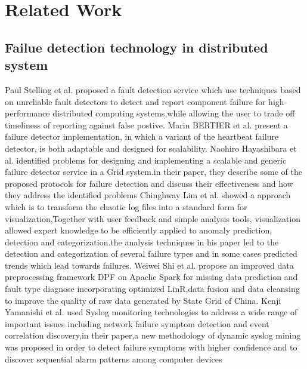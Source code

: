 

\section{Related Work}
\label{related work}


\subsection{Failue detection technology in distributed system}
Paul Stelling et al.\cite{zou2014improving} proposed a fault detection service which use techniques based on unreliable fault detectors to detect and report component failure for high-performance distributed computing systems,while allowing the user to trade off timeliness of reporting against false postive.
Marin BERTIER et al.\cite{bertier2003performance}  present a failure detector implementation, in which a variant of the heartbeat failure detector, is both adaptable and designed for scalability.
Naohiro Hayashibara et al.\cite{hayashibara2002failure} identified problems for designing and implementing a scalable and generic failure detector service in a Grid system.in their paper, they describe some of the proposed protocols for failure detection and discuss their effectiveness and how they address the identified problems
Chinghway Lim et al.\cite{lim2008log} showed a approach which is to transform the chaotic log files into a standard form for visualization,Together with user feedback and simple analysis tools, visualization allowed expert knowledge to be efficiently applied to anomaly prediction, detection and
categorization.the analysis techniques in his paper led to the detection and categorization of several failure types and in some cases
predicted trends which lead towards failures.
Weiwei Shi et al.\cite{shi2016integrated} propose an improved data preprocessing framework DPF on Apache Spark for missing data prediction and fault type diagnose incorporating optimized LinR,data fusion and data cleansing to improve the quality of raw data generated by State Grid of China.
Kenji Yamanishi et al.\cite{yamanishi2005dynamic} used Syslog monitoring technologies to address a wide range of important issues including network failure symptom detection and event correlation discovery,in their paper,a new methodology of dynamic syslog mining was proposed in order to detect failure symptoms with higher confidence and to discover sequential alarm patterns among computer devices
